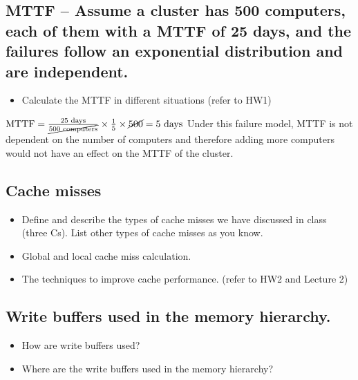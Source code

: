 \documentclass[11pt]{article}
\begin{document}
\subsection {MTTF -- Assume a cluster has 500 computers, each of them with a MTTF of 25 days, and the failures follow an exponential distribution and are independent.}
    \begin{itemize}
        \item Calculate the MTTF in different situations (refer to HW1)
    \end{itemize}
    \begin{tcolorbox}[colback=CrispBlue!5!white,colframe=CrispBlue!75!black,title=]
        \( \text{MTTF} = \frac{25\text{ days}}{\cancel{500 \text{ computers}}} \times \frac{1}{5} \times \cancel{500} = 5 \text{ days}\\[1em]
        \)
        Under this failure model, MTTF is not dependent on the number of computers and therefore adding more computers would not have an effect on the MTTF of the cluster.
    \end{tcolorbox}

\subsection {Cache misses}
    \begin{itemize}
        \item Define and describe the types of cache misses we have discussed in class (three Cs). List other types of cache misses as you know.
        \item Global and local cache miss calculation.
        \item The techniques to improve cache performance. (refer to HW2 and Lecture 2)
    \end{itemize}
\subsection {Write buffers used in the memory hierarchy.}
    \begin{itemize}
        \item How are write buffers used?
        \item Where are the write buffers used in the memory hierarchy?
    \end{itemize}
\end{document}
